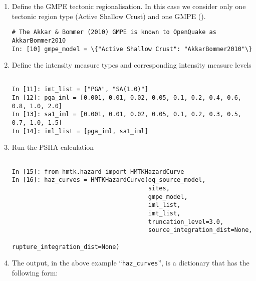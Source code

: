 \begin{enumerate}
\item Define the GMPE tectonic regionalisation. In this case we consider only one tectonic region type (Active Shallow Crust) and one GMPE (\cite{akkar2010}). 

\begin{Verbatim}[frame=single, commandchars=\\\{\}, fontsize=\scriptsize, samepage=true]
# The Akkar & Bommer (2010) GMPE is known to OpenQuake as AkkarBommer2010
In: [10] gmpe_model = \{"Active Shallow Crust": "AkkarBommer2010"\}
\end{Verbatim}

\item Define the intensity measure types and corresponding intensity measure levels

\begin{Verbatim}[frame=single, commandchars=\\\{\}, fontsize=\scriptsize, samepage=true]

In [11]: imt_list = ["PGA", "SA(1.0)"]
In [12]: pga_iml = [0.001, 0.01, 0.02, 0.05, 0.1, 0.2, 0.4, 0.6, 0.8, 1.0, 2.0]
In [13]: sa1_iml = [0.001, 0.01, 0.02, 0.05, 0.1, 0.2, 0.3, 0.5, 0.7, 1.0, 1.5]
In [14]: iml_list = [pga_iml, sa1_iml]
\end{Verbatim}

\item Run the PSHA calculation

\begin{Verbatim}[frame=single, commandchars=\\\{\}, fontsize=\scriptsize, samepage=true]

In [15]: from hmtk.hazard import HMTKHazardCurve
In [16]: haz_curves = HMTKHazardCurve(oq_source_model,
                                      sites,
                                      gmpe_model,
                                      iml_list,
                                      imt_list,
                                      truncation_level=3.0,
                                      source_integration_dist=None,
                                      rupture_integration_dist=None)
\end{Verbatim}

\item The output, in the above example ``\verb=haz_curves='', is a dictionary that has the following form:

\begin{Verbatim}[frame=single, commandchars=\\\{\}, fontsize=\scriptsize, samepage=true]


\end{Verbatim}
\end{enumerate}
